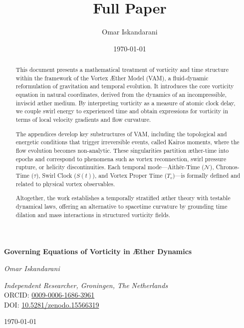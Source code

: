\documentclass[a4paper,12pt]{article}
\title{Full Paper}
\author{Omar Iskandarani}
\date{\today}
\begin{document}
\begin{titlepage}
    \thispagestyle{empty}
    \centering
    \vspace*{2cm}
    {\Huge\bfseries Governing Equations of Vorticity in Æther Dynamics \par}
    \vspace{0.5cm}
    {\Large\itshape Omar Iskandarani\par}
    \vspace{0.5cm}
    \textit{Independent Researcher, Groningen, The Netherlands} \\
    ORCID: \href{https://orcid.org/0009-0006-1686-3961}{0009-0006-1686-3961} \\
    DOI: \href{https://doi.org/10.5281/zenodo.15566319}{10.5281/zenodo.15566319} \\
    {\large \today\par}

    \begin{abstract}
        This document presents a mathematical treatment of vorticity and time structure within the framework of the Vortex Æther Model (VAM), a fluid-dynamic reformulation of gravitation and temporal evolution. It introduces the core vorticity equation in natural coordinates, derived from the dynamics of an incompressible, inviscid æther medium. By interpreting vorticity as a measure of atomic clock delay, we couple swirl energy to experienced time and obtain expressions for vorticity in terms of local velocity gradients and flow curvature.

        The appendices develop key substructures of VAM, including the topological and energetic conditions that trigger irreversible events, called Kairos moments, where the flow evolution becomes non-analytic. These singularities partition æther-time into epochs and correspond to phenomena such as vortex reconnection, swirl pressure rupture, or helicity discontinuities. Each temporal mode—Aithēr-Time (\( \mathcal{N} \)), Chronos-Time (\( \tau \)), Swirl Clock (\( S(t) \)), and Vortex Proper Time (\( T_v \))—is formally defined and related to physical vortex observables.

        Altogether, the work establishes a temporally stratified æther theory with testable dynamical laws, offering an alternative to spacetime curvature by grounding time dilation and mass interactions in structured vorticity fields.
    \end{abstract}



\end{titlepage}



    \tableofcontents



    \appendix
    \def\standalonechapter{false}
    
    
    
    

    
    
\end{document}
